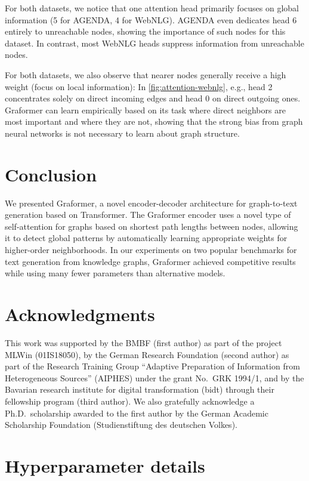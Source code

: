 \documentclass[11pt]{article}
\begin{document}
For both datasets,
we notice that one attention head primarily focuses on global information
(5 for AGENDA, 4 for WebNLG).
AGENDA even dedicates head 6 entirely to unreachable nodes, showing the importance of such nodes for this dataset.
In contrast, most WebNLG heads
suppress information from unreachable nodes.

For both datasets,
we also observe that nearer nodes generally receive a high weight (focus on local information):
In \cref{fig:attention-webnlg}, e.g., head 2 concentrates solely on direct incoming edges and head 0 on direct outgoing ones.
Graformer can learn empirically based on its task
where direct neighbors are most important and where they are not, 
showing that the strong bias from graph neural networks is
not
necessary to learn about graph structure.


\section{Conclusion}
We presented
Graformer,
a novel encoder-decoder architecture for graph-to-text generation based on Transformer.
The Graformer encoder uses a novel type of self-attention
for graphs based on shortest path lengths between nodes,
allowing it to detect global patterns
by automatically learning appropriate weights for higher-order neighborhoods.
In our experiments on two popular benchmarks for text generation from knowledge graphs,
Graformer achieved competitive results
while using many fewer parameters than alternative models.

\section*{Acknowledgments}

This work was supported by the
BMBF (first author) as part of the project MLWin (01IS18050),
by the German Research Foundation (second author) as part of the Research Training Group ``Adaptive Preparation of Information from Heterogeneous Sources'' (AIPHES) under the grant No.\ GRK 1994/1,
and by the Bavarian research institute for digital transformation (bidt) through their fellowship program (third author).
We also gratefully acknowledge a Ph.D.\ scholarship
awarded to the first author by the German Academic Scholarship Foundation (Studienstiftung des
deutschen Volkes).




\appendix
\section{Hyperparameter details}
\label{app:hyperparam}
\end{document}
